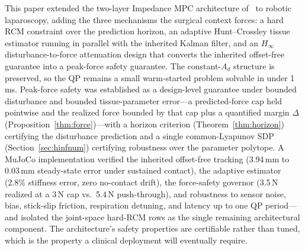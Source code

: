 This paper extended the two-layer Impedance MPC architecture of~\cite{cao2026phri} to robotic laparoscopy, adding the three mechanisms the surgical context forces: a hard RCM constraint over the prediction horizon, an adaptive Hunt--Crossley tissue estimator running in parallel with the inherited Kalman filter, and an $H_\infty$ disturbance-to-force attenuation design that converts the inherited offset-free guarantee into a peak-force safety guarantee. The constant-$A_d$ structure is preserved, so the QP remains a small warm-started problem solvable in under 1\,ms. Peak-force safety was established as a design-level guarantee under bounded disturbance and bounded tissue-parameter error---a predicted-force cap held pointwise and the realized force bounded by that cap plus a quantified margin $\Delta$ (Proposition~\ref{thm:force})---with a horizon criterion (Theorem~\ref{thm:horizon}) certifying the disturbance prediction and a single common-Lyapunov SDP (Section~\ref{sec:hinfnum}) certifying robustness over the parameter polytope. A MuJoCo implementation verified the inherited offset-free tracking (3.94\,mm to 0.03\,mm steady-state error under sustained contact), the adaptive estimator (2.8\% stiffness error, zero no-contact drift), the force-safety governor (3.5\,N realized at a 3\,N cap vs.\ 5.4\,N push-through), and robustness to sensor noise, bias, stick-slip friction, respiration detuning, and latency up to one QP period---and isolated the joint-space hard-RCM rows as the single remaining architectural component. The architecture's safety properties are certifiable rather than tuned, which is the property a clinical deployment will eventually require.

